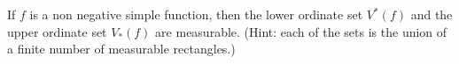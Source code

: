 If $f$ is a non negative simple function, then the lower ordinate set $V^*(f)$ and the upper ordinate set $V_*(f)$ are measurable. (Hint: each of the sets is the union of a finite number of measurable rectangles.)

